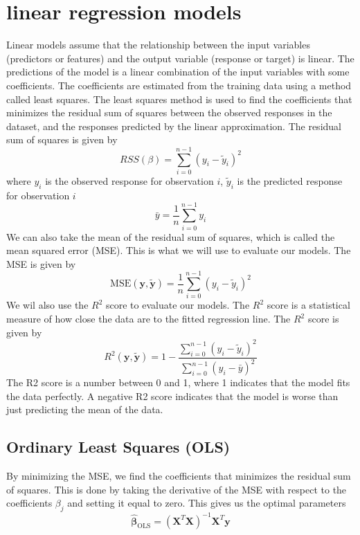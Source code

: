 \documentclass[twoside,11pt]{report}
\begin{document}
\section{linear regression models }
\label{sec:models}

Linear models assume that the relationship between the input variables (predictors or features) 
and the output variable (response or target) is linear. The predictions of the model is a linear
combination of the input variables with some coefficients. The coefficients are estimated from
the training data using a method called least squares. The least squares method is used to find
the coefficients that minimizes the residual sum of squares between the observed responses in
the dataset, and the responses predicted by the linear approximation. The residual sum of squares
is given by
$$
RSS(\beta) = \sum_{i=0}^{n-1} (y_i - \tilde{y}_i)^2
$$
where $y_i$ is the observed response for observation $i$, $\tilde{y}_i$ is the predicted response for observation $i$ 
$$
\bar{y} =  \frac{1}{n} \sum_{i=0}^{n - 1} y_i
$$
We can also take the mean of the residual sum of squares, which is called the mean squared error (MSE). This is what we will use to
evaluate our models. The MSE is given by
$$
\mbox{MSE}(\mathbf{y},\mathbf{\tilde{y}}) = \frac{1}{n}
\sum_{i=0}^{n-1}(y_i-\tilde{y}_i)^2
$$
We wil also use the $R^2$ score to evaluate our models. The $R^2$ score is a statistical measure of how close the data are to the fitted regression line. The $R^2$ score is given by
$$
R^2(\mathbf{y}, \tilde{\mathbf{y}}) = 1 - \frac{\sum_{i=0}^{n - 1} (y_i - \tilde{y}_i)^2}{\sum_{i=0}^{n - 1} (y_i - \bar{y})^2}
$$
The R2 score is a number between 0 and 1, where 1 indicates that the model fits the data perfectly. 
A negative R2 score indicates that the model is worse than just predicting the mean of the data.





\subsection{Ordinary Least Squares (OLS)}
\label{sec:ols}


By minimizing the MSE, we find the coefficients that minimizes the residual sum of squares. This is done by taking the derivative of the
MSE with respect to the coefficients $\beta_j$ and setting it equal to zero. This gives us the optimal parameters
$$
\hat{\mathbf{\beta}}_{\mathrm{OLS}} = \left(\mathbf{X}^T\mathbf{X}\right)^{-1}\mathbf{X}^T\mathbf{y}
$$
\end{document}

